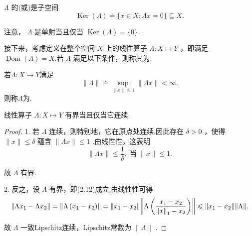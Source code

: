 $\Lambda$ 的(或)是子空间
\[
\operatorname{Ker}\left( \Lambda \right)  \doteq  \{ x \in  X;{\Lambda x} = 0\}  \subseteq  X.
\]

注意， $\Lambda$ 是单射当且仅当 $\operatorname{Ker}\left( \Lambda \right)  = \{ 0\}$ .

接下来，考虑定义在整个空间 $X$ 上的线性算子 $\Lambda  : X \mapsto  Y$ ，即满足 $\operatorname{Dom}\left( \Lambda \right)  = X$.若 $\Lambda$ 满足以下条件，则称其为:
\begin{definition}[有界线性算子]
    若$\Lambda:X\to Y$满足\begin{equation}\tag{2.12}
    \| \Lambda \|  \doteq  \mathop{\sup }\limits_{{\| x\|  \leq  1}}\| {\Lambda x}\|  < \infty .
    \end{equation}
    则称$\Lambda$为.
\end{definition}


\begin{theorem}[有界算子的连续性]
    线性算子 $\Lambda  : X \mapsto  Y$ 有界当且仅当它连续.
\end{theorem}
\begin{proof}
1. 若 $\Lambda$ 连续，则特别地，它在原点处连续.因此存在 $\delta  > 0$ ，使得 $\| x\|  \leq  \delta$ 蕴含 $\| {\Lambda x}\|  \leq  1$ .由线性性，这表明
\[
\| {\Lambda x}\|  \leq  \frac{1}{\delta },\;\text{当}\;\| x\|  \leq  1.
\]

故 $\Lambda$ 有界.

2. 反之，设 $\Lambda$ 有界，即(2.12)成立.由线性性可得
\[
\norm{\Lambda {x}_{1} - \Lambda {x}_{2}} = \norm{\Lambda \left( {{x}_{1} - {x}_{2}}\right) } = \norm{{x}_{1} - {x}_{2}}\norm{\Lambda \left( \frac{{x}_{1} - {x}_{2}}{\norm{x}_{1} - {x}_{2}}\right) } \leqslant  \norm{{x}_{1} - {x}_{2}}\norm{\Lambda} .
\]

故 $\Lambda$ 一致Lipschitz连续，Lipschitz常数为 $\| \Lambda \|$ .
\end{proof}

